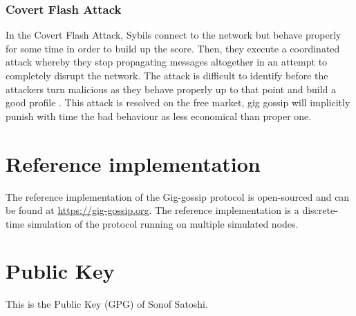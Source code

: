 \documentclass{article}
\begin{document}
\subsubsection{Covert Flash Attack}
In the Covert Flash Attack, Sybils connect to the network but behave properly for some time in order to build up the score. Then, they execute a coordinated attack whereby they stop propagating messages altogether in an attempt to completely disrupt the network. The attack is difficult to identify before the attackers turn malicious as they behave properly up to that point and build a good profile \cite{GossipSub}. This attack is resolved on the free market, gig gossip will implicitly punish with time the bad behaviour as less economical than proper one. 

\section{Reference implementation}
The reference implementation of the Gig-gossip protocol is open-sourced and can be found at \url{https://gig-gossip.org}. The reference implementation is a discrete-time simulation of the protocol running on multiple simulated nodes.

\section{Public Key}
This is the Public Key (GPG) of Sonof Satoshi.
\label{gpgkey}
\begin{tiny}
	
\end{tiny}



  
\end{document}
